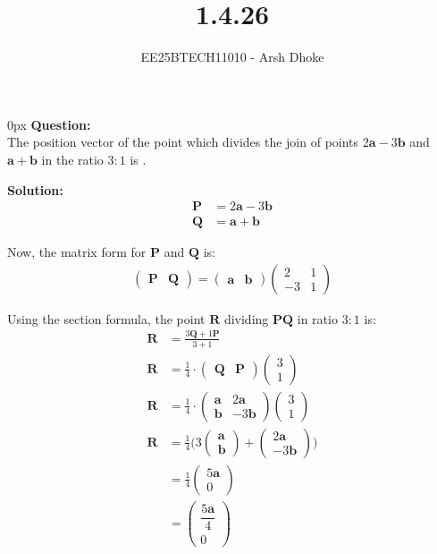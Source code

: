 \documentclass[journal]{IEEEtran}
\renewcommand{\vec}[1]{\mathbf{#1}} %
\newcommand{\solution}{\textbf{Solution: }}
\newcommand{\myvec}[1]{\begin{pmatrix}#1\end{pmatrix}}
\begin{document}

\vspace{3cm}

\title{1.4.26}
\author{EE25BTECH11010 - Arsh Dhoke}
{\let\newpage\relax\maketitle}

\renewcommand{\thefigure}{\theenumi}
\renewcommand{\thetable}{\theenumi}
\setlength{\intextsep}{10pt}

\parindent 0px
\textbf{Question:} \\
The position vector of the point which divides the join of points $2\vec{a} - 3\vec{b}$ and $\vec{a} + \vec{b}$ in the ratio $3:1$ is \underline{\hspace{2cm}}.

\solution \\

\begin{align}
    \vec{P} &= 2\vec{a}-3\vec{b}\\
    \vec{Q} &= \vec{a}+\vec{b}
\end{align}

Now, the matrix form for $\vec{P}$ and $\vec{Q}$ is:
\begin{align}
\myvec{\vec{P} & \vec{Q}}
=\myvec{\vec{a} & \vec{b}}
\myvec{2 & 1 \\ -3 & 1}
\end{align}

Using the section formula, the point $\vec{R}$ dividing $\vec{PQ}$ in ratio $3:1$ is:
\begin{align}
\vec{R} &= \frac{3\vec{Q} + 1\vec{P}}{3+1} \\[6pt]
\vec{R} &= \frac{1}{4} \cdot \myvec{\vec{Q} & \vec{P}} \myvec{3 \\[6pt] 1} \\[6pt]
\vec{R} &=\frac{1}{4} \cdot \myvec{\vec{a} &   2\vec{a} \\ \vec{b} & -3\vec{b}} \myvec{3 \\[6pt] 1} \\[6pt]
\vec{R} &= \frac{1}{4}\Big(3\myvec{\vec{a} \\ \vec{b}} + \myvec{2\vec{a} \\ -3\vec{b}}\Big) \\[6pt]
&= \frac{1}{4}\myvec{5\vec{a} \\ 0} \\[6pt]
&= \myvec{\dfrac{5\vec{a}}{4} \\ 0}
\end{align}
\end{document}
